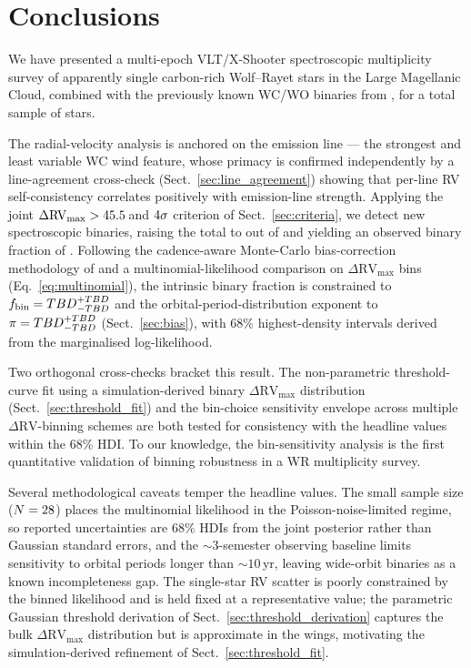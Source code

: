 \section{Conclusions}
\label{sec:conclusions}

We have presented a multi-epoch VLT/X-Shooter spectroscopic multiplicity
survey of \Nstars apparently single carbon-rich Wolf--Rayet stars in the
Large Magellanic Cloud, combined with the \Nknown previously known
WC/WO binaries from \citet{Bartzakos2001}, for a total sample of
\Ntotal stars.

The radial-velocity analysis is anchored on the \primaryline emission
line --- the strongest and least variable WC wind feature, whose primacy
is confirmed independently by a line-agreement cross-check
(Sect.~\ref{sec:line_agreement}) showing that per-line RV
self-consistency correlates positively with emission-line strength.
Applying the joint $\Delta\mathrm{RV}_{\max} > 45.5$\,\kms and
$4\sigma$ criterion of Sect.~\ref{sec:criteria}, we detect
\Ndetected new spectroscopic binaries, raising the total to \Nbin out of
\Ntotal and yielding an observed binary fraction of \fbinobs.
Following the cadence-aware Monte-Carlo bias-correction methodology of
\citet{Dsilva2023} and a multinomial-likelihood comparison on
$\Delta\mathrm{RV}_{\max}$ bins (Eq.~\ref{eq:multinomial}), the
intrinsic binary fraction is constrained to
$f_\mathrm{bin} = {TBD}^{+TBD}_{-TBD}$ and the
orbital-period-distribution exponent to
$\pi = {TBD}^{+TBD}_{-TBD}$ (Sect.~\ref{sec:bias}),
with 68\% highest-density intervals derived from the marginalised
log-likelihood.

Two orthogonal cross-checks bracket this result. The non-parametric
threshold-curve fit using a simulation-derived binary
$\Delta\mathrm{RV}_{\max}$ distribution (Sect.~\ref{sec:threshold_fit})
and the bin-choice sensitivity envelope across multiple
$\Delta\mathrm{RV}$-binning schemes are both tested for consistency with
the headline values within the 68\% HDI. To our knowledge, the
bin-sensitivity analysis is the first quantitative validation of
binning robustness in a WR multiplicity survey.

Several methodological caveats temper the headline values. The small
sample size ($N = 28$) places the multinomial likelihood in the
Poisson-noise-limited regime, so reported uncertainties are 68\% HDIs
from the joint posterior rather than Gaussian standard errors, and the
$\sim$3-semester observing baseline limits sensitivity to orbital
periods longer than $\sim 10$\,yr, leaving wide-orbit binaries as a
known incompleteness gap. The single-star RV scatter is poorly
constrained by the binned likelihood and is held fixed at a
representative value; the parametric Gaussian threshold derivation of
Sect.~\ref{sec:threshold_derivation} captures the bulk
$\Delta\mathrm{RV}_{\max}$ distribution but is approximate in the
wings, motivating the simulation-derived refinement of
Sect.~\ref{sec:threshold_fit}.


